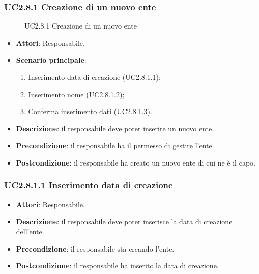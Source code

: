 \subsubsection{UC2.8.1 Creazione di un nuovo ente}
\begin{figure}[H]
\centering
\noindent{}
\caption{UC2.8.1 Creazione di un nuovo ente}
\end{figure}
\begin{itemize}
\item \textbf{Attori}: Responsabile.
\item \textbf{Scenario principale}:
\begin{enumerate}
\item Inserimento data di creazione (UC2.8.1.1);
\item Inserimento nome (UC2.8.1.2);
\item Conferma inserimento dati (UC2.8.1.3).
\end{enumerate}
\item \textbf{Descrizione}: il responsabile deve poter inserire un nuovo ente.
\item \textbf{Precondizione}: il responsabile ha il permesso di gestire l'ente.
\item \textbf{Postcondizione}: il responsabile ha creato un nuovo ente di cui ne è il capo.
\end{itemize}
\subsubsection{UC2.8.1.1 Inserimento data di creazione}
\begin{itemize}
\item \textbf{Attori}: Responsabile.
\item \textbf{Descrizione}: il responsabile deve poter inserisce la data di creazione dell'ente.
\item \textbf{Precondizione}: il responsabile sta creando l'ente.
\item \textbf{Postcondizione}: il responsabile ha inserito la data di creazione.
\end{itemize}
